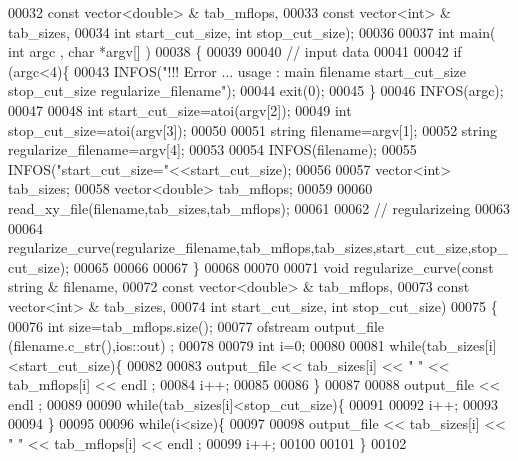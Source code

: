 \begin{DoxyCode}
00032               \textcolor{keyword}{const} vector<double> & tab\_mflops, 
00033               \textcolor{keyword}{const} vector<int> & tab\_sizes, 
00034               \textcolor{keywordtype}{int} start\_cut\_size, \textcolor{keywordtype}{int} stop\_cut\_size);
00036 
00037 \textcolor{keywordtype}{int} main( \textcolor{keywordtype}{int} argc , \textcolor{keywordtype}{char} *argv[] )
00038 \{
00039 
00040   \textcolor{comment}{// input data}
00041 
00042   \textcolor{keywordflow}{if} (argc<4)\{
00043     INFOS(\textcolor{stringliteral}{"!!! Error ... usage : main filename start\_cut\_size stop\_cut\_size regularize\_filename"});
00044     exit(0);
00045   \}
00046   INFOS(argc);
00047 
00048   \textcolor{keywordtype}{int} start\_cut\_size=atoi(argv[2]);
00049   \textcolor{keywordtype}{int} stop\_cut\_size=atoi(argv[3]);
00050 
00051   \textcolor{keywordtype}{string} filename=argv[1];
00052   \textcolor{keywordtype}{string} regularize\_filename=argv[4];
00053   
00054   INFOS(filename);
00055   INFOS(\textcolor{stringliteral}{"start\_cut\_size="}<<start\_cut\_size);
00056 
00057   vector<int> tab\_sizes;
00058   vector<double> tab\_mflops;
00059 
00060   read\_xy\_file(filename,tab\_sizes,tab\_mflops);
00061 
00062   \textcolor{comment}{// regularizeing}
00063 
00064   regularize\_curve(regularize\_filename,tab\_mflops,tab\_sizes,start\_cut\_size,stop\_cut\_size);
00065   
00066 
00067 \}
00068 
00070 
00071 \textcolor{keywordtype}{void} regularize\_curve(\textcolor{keyword}{const} \textcolor{keywordtype}{string} & filename,
00072               \textcolor{keyword}{const} vector<double> & tab\_mflops, 
00073               \textcolor{keyword}{const} vector<int> & tab\_sizes, 
00074               \textcolor{keywordtype}{int} start\_cut\_size, \textcolor{keywordtype}{int} stop\_cut\_size)
00075 \{
00076   \textcolor{keywordtype}{int} size=tab\_mflops.size();
00077   ofstream output\_file (filename.c\_str(),ios::out) ;
00078 
00079   \textcolor{keywordtype}{int} i=0;
00080 
00081   \textcolor{keywordflow}{while}(tab\_sizes[i]<start\_cut\_size)\{
00082     
00083     output\_file << tab\_sizes[i] << \textcolor{stringliteral}{" "} <<  tab\_mflops[i] << endl ;
00084     i++;
00085 
00086   \}
00087     
00088   output\_file << endl ;
00089 
00090   \textcolor{keywordflow}{while}(tab\_sizes[i]<stop\_cut\_size)\{
00091     
00092     i++;
00093 
00094   \}
00095 
00096   \textcolor{keywordflow}{while}(i<size)\{
00097     
00098     output\_file << tab\_sizes[i] << \textcolor{stringliteral}{" "} <<  tab\_mflops[i] << endl ;
00099     i++;
00100 
00101   \}
00102 

\end{DoxyCode}
